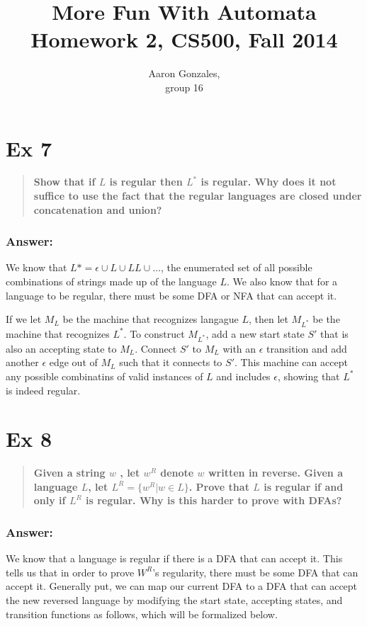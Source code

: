 \documentclass[titlepage]{article}\usepackage[]{graphicx}\usepackage[]{color}
\begin{document}
\title{More Fun With Automata \\ Homework 2, CS500, Fall 2014}
\author{Aaron Gonzales, \\ group 16}
\maketitle


\section*{Ex 7}
\begin{quote}
  \textbf{Show that if $L$ is regular then $L^*$ is regular. Why does it not suffice
  to use the fact that the regular languages are closed under concatenation and
  union?}
\end{quote}
\subsubsection*{Answer:}
We know that $L* = \epsilon \cup L \cup LL \cup \dots$, the enumerated set of
all possible combinations of strings made up of the language $L$. We also know
that for a language to be regular, there must be some DFA or NFA that can
accept it. 

If we let $M_L$ be the machine that recognizes langague $L$, then let $M_{L^*}$
be the machine that recognizes $L^*$. To construct $M_{L^*}$, add a new start
state $S'$ that is also an accepting state to $M_L$. Connect $S'$ to $M_L$ with
an $\epsilon$ transition and add another $\epsilon$ edge out of $M_L$ such that
it connects to $S'$. This machine can accept any possible combinatins of valid
instances of $L$ and includes $\epsilon$, showing that $L^*$ is indeed regular. 



\section*{Ex 8}
\begin{quote}
  \textbf{Given a string $w$ , let $w^R$ denote $w$ written in reverse.
    Given a language $L$, let $L^R = \{w^R | w \in L \}$. Prove that $L$ is regular if and
    only if $L^R$ is regular. Why is this harder to prove with DFAs?}
\end{quote}
\subsubsection{Answer:}
We know that a language is regular if there is a DFA that can accept it. This
tells us that in order to prove $W^R$'s regularity, there must be some DFA that
can accept it. Generally put, we can map our current DFA to a DFA that can
accept the new reversed language by modifying the start state, accepting
states, and transition functions as follows, which will be formalized below.
\end{document}
